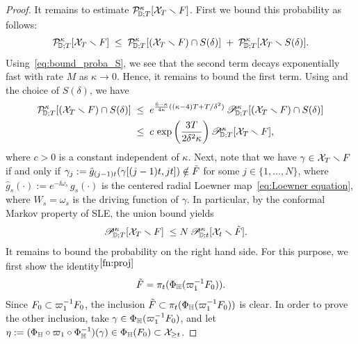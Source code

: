 \documentclass[a4paper, 11pt]{article}
\theoremstyle{definition}
\numberwithin{equation}{section}
\numberwithin{figure}{section}
\newcommand{\prDpaths}[1]{\pi_{#1}}
\newcommand{\prHpaths}[1]{\varpi_{#1}}
\newcommand{\Dpaths}[1][]{\cX_{#1}}
\newcommand{\rDmeasure}[2][]{\mathcal{P}^{#2}_{\!\bD;#1}}
\newcommand{\cDmeasure}[2][]{\mathscr{P}^{#2}_{\!\bD;#1}}
\begin{document}
\begin{proof}
It remains to estimate $\rDmeasure[T]{\kappa}[\Dpaths[T] \smallsetminus \compact]$. 
First we bound this probability as follows:
\begin{align*}
\rDmeasure[T]{\kappa}[\Dpaths[T] \smallsetminus \compact] 
\; \le \; \rDmeasure[T]{\kappa}[(\Dpaths[T] \smallsetminus \compact) \cap S(\delta)] 
\; + \; \rDmeasure[T]{\kappa}[\Dpaths[T] \smallsetminus S(\delta)] .
\end{align*}
Using~\eqref{eq:bound_proba_S}, we see that the second term decays exponentially fast with rate $M$ as $\kappa \to 0$. 
Hence, it remains to bound the first term. 
Using  and the choice of $S(\delta)$, we have
\begin{align}
\rDmeasure[T]{\kappa}[(\Dpaths[T] \smallsetminus \compact) \cap S(\delta)] 
\; \le\; \; & e^{\frac{6-\kappa}{4\kappa} ((\kappa-4)T 
+ T/\delta^2 )} \, \cDmeasure[T]{\kappa} [(\Dpaths[T] \smallsetminus \compact) \cap S(\delta)] \nonumber \\
\; \le\;\; & c \, \exp\bigg(\frac{3T}{2\delta^2\kappa}\bigg) \, \cDmeasure[T]{\kappa} [\Dpaths[T] \smallsetminus \compact] ,
\label{eqn:exponential-tightness-step}
\end{align}
where $c > 0$ is a constant independent of $\kappa$.
Next, note that we have $\gamma \in \Dpaths[T] \smallsetminus \compact$ if and only if 
$\gamma_j := \hat g_{(j-1)t} (\gamma[(j-1)t, jt]) \notin \tilde {F}$ for some $j \in \{1, \dots, N\}$, where $\hat g_s(\cdot) := e^{-\ii \omega_s} \, g_s(\cdot)$ is the centered radial Loewner map~\eqref{eq:Loewner equation}, 
where $W_s = \omega_s$ is the driving function of $\gamma$.
In particular, by the conformal Markov property of SLE, the union bound yields
\begin{align*}
	\cDmeasure[T]{\kappa} [\Dpaths[T] \smallsetminus \compact]
	\; \le \; & N \, \cDmeasure[t]{\kappa} [\Dpaths[t] \smallsetminus \tilde{\compact}].
\end{align*}
It remains to bound the probability on the right hand side.
For this purpose, we first show the identity${}^{\ref{fn:proj}}$ 
\begin{align}\label{eqn:tildeF}
\tilde F = \prDpaths{t}(\Phi_\bH(\prHpaths{1}^{-1} \compact_0)).
\end{align}
Since $\compact_0 \subset \prHpaths{1}^{-1} \compact_0$, the inclusion $\tilde F \subset \prDpaths{t}(\Phi_\bH(\prHpaths{1}^{-1} \compact_0))$ is clear. 
In order to prove the other inclusion, take $\gamma \in \Phi_\bH(\prHpaths{1}^{-1}\compact_0)$, and let $\eta := (\Phi_\bH \circ \prHpaths{1} \circ \Phi_\bH^{-1})(\gamma) \in \Phi_\bH(\compact_0) \subset \Dpaths[\ge t]$. 

\end{proof}
\end{document}
